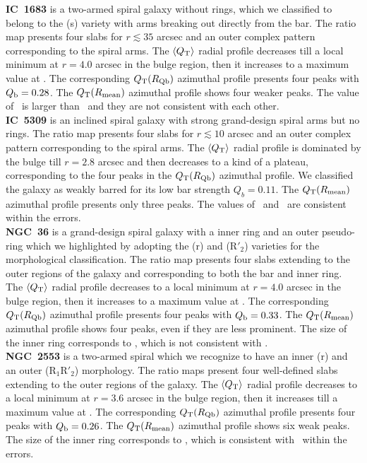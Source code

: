 \documentclass{aa}
\begin{document}
\noindent \textbf{IC~1683} is a two-armed spiral galaxy without rings, which we classified to belong to the (s) variety with arms breaking out directly from the bar. The ratio map presents four slabs for $r\lesssim35$ arcsec and an outer complex pattern corresponding to the spiral arms. The $\langle Q_{\rm T}\rangle$ radial profile decreases till a local minimum at $r=4.0$ arcsec in the bulge region, then it increases to a maximum value at \rqb. The corresponding $Q_{\rm T}(R_{\rm Qb})$ azimuthal profile presents four peaks with $Q_{\rm b}=0.28$. The $Q_{\rm T}(R_{\rm mean})$ azimuthal profile shows four weaker peaks. The value of \rmean\ is larger than \rqb\ and they are not consistent with each other.\\

\noindent \textbf{IC~5309} is an inclined spiral galaxy with strong grand-design spiral arms but no rings. The ratio map presents four slabs for $r\lesssim10$ arcsec and an outer complex pattern corresponding to the spiral arms. The $\langle Q_{\rm T}\rangle$ radial profile is dominated by the bulge till $r=2.8$ arcsec and then decreases to a kind of a plateau, corresponding to the four peaks in the $Q_{\rm T}(R_{\rm Qb})$ azimuthal profile. We classified the galaxy as weakly barred for its low bar strength $Q_b=0.11$. The $Q_{\rm T}(R_{\rm mean})$ azimuthal profile presents only three peaks. The values of \rmean\ and \rqb\ are consistent within the errors.\\

\noindent \textbf{NGC~36} is a grand-design spiral galaxy with a inner ring and an outer pseudo-ring which we highlighted by adopting the (r) and (R$'_2$) varieties for the morphological classification. The ratio map presents four slabs extending to the outer regions of the galaxy and corresponding to both the bar and inner ring. The $\langle Q_{\rm T}\rangle$ radial profile decreases to a local minimum at $r=4.0$ arcsec in the bulge region, then it increases to a maximum value at \rqb. The corresponding $Q_{\rm T}(R_{\rm Qb})$ azimuthal profile presents four peaks with $Q_{\rm b}=0.33$. The $Q_{\rm T}(R_{\rm mean})$ azimuthal profile shows four peaks, even if they are less prominent. The size of the inner ring corresponds to \rmean, which is not consistent with \rqb.\\

\noindent \textbf{NGC~2553} is a two-armed spiral which we recognize to have an inner (r) and an outer (R$_1$R$'_2$) morphology. The ratio
maps present four well-defined slabs extending to the outer regions of the galaxy. The $\langle Q_{\rm T}\rangle$ radial profile decreases to a local minimum at $r=3.6$ arcsec in the bulge region, then it increases till a maximum value at \rqb. The corresponding $Q_{\rm T}(R_{\rm Qb})$ azimuthal profile presents four peaks with $Q_{\rm b}=0.26$. The $Q_{\rm T}(R_{\rm mean})$ azimuthal profile shows six weak peaks. The size of the inner ring corresponds to \rmean, which is consistent with \rqb\ within the
errors.\\
\end{document}
